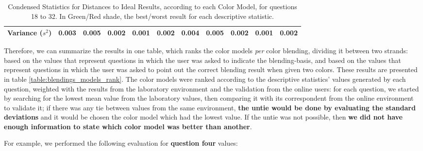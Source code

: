 \begin{itemize}
\begin{table}[htbp]
{\begin{tabular}{@{}ccccccccccc@{}}
      \multicolumn{1}{c|}{Variance ($s^2$)}                                         & \cellcolor[HTML]{FFFFFF}0.003         & \cellcolor[HTML]{FD6864}\textbf{0.005} & \cellcolor[HTML]{FFFFFF}0.002         & \cellcolor[HTML]{32CB00}\textbf{0.001} & \multicolumn{1}{c|}{\cellcolor[HTML]{FFFFFF}0.002}         & \cellcolor[HTML]{FFFFFF}0.004         & \cellcolor[HTML]{FD6864}\textbf{0.005} & \cellcolor[HTML]{FFFFFF}0.002         & \cellcolor[HTML]{32CB00}\textbf{0.001} & \multicolumn{1}{c|}{\cellcolor[HTML]{FFFFFF}0.002} \\ \bottomrule
    \end{tabular}}
    \caption[Condensed Statistics for Distances to Ideal Results, according to each Color Model, for questions 18 to 32.]{Condensed Statistics for Distances to Ideal Results, according to each Color Model, for questions 18 to 32. In Green/Red shade, the best/worst result for each descriptive statistic.}
    \label{table:colormodels_expectations_labonline_statistics}
  \end{table}
\end{itemize} \par
%
Therefore, we can summarize the results in one table, which ranks the color models \emph{per} color blending, dividing it between two strands: based on the values that represent questions in which the user was
asked to indicate the blending-basis, and based on the values that represent questions in which the user was asked to point out the correct blending result when given two colors. These results are presented in
table \ref{table:blendings_models_rank}. The color models were ranked according to the descriptive statistics' values generated by each question, weighted with the results from the laboratory environment and the
validation from the online users: for each question, we started by searching for the lowest mean value from the laboratory values, then comparing it with its correspondent from the online environment to validate
it; if there was any tie between values from the same environment, \textbf{the untie would be done by evaluating the standard deviations} and it would be chosen the color model which had the lowest value. If the
untie was not possible, then \textbf{we did not have enough information to state which color model was better than another}. \par
%
For example, we performed the following evaluation for \textbf{question four} values:
%
